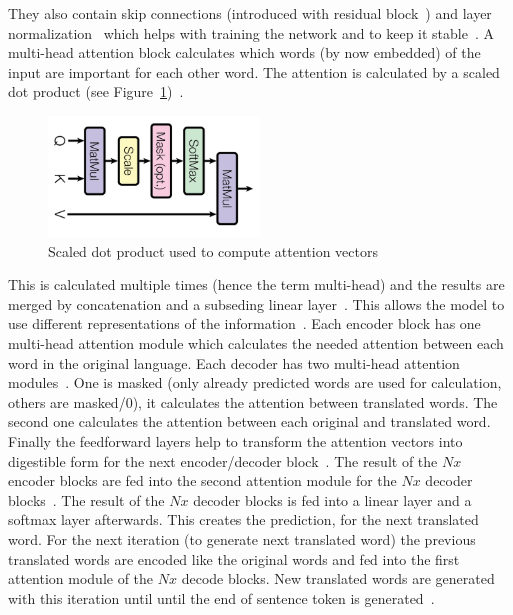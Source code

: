 They also contain skip connections (introduced with residual block~\citep{he_deep_2015}) and layer
normalization~\citep{vaswani_attention_2017} which helps with training the network and to keep it
stable~\citep{liu_rethinking_2021}.
A multi-head attention block calculates which words (by now embedded) of the input are
important for each other word.
The attention is calculated by a scaled dot product (see
Figure~\ref{fig:transformer-dot-product})~\citep{vaswani_attention_2017}.
\begin{figure}[ht]
    \centering
    \includegraphics[width=0.5\textwidth]{img/Transformer-Scaled-Dot-Product-Vasani-Attention-2017.png}
    \caption{Scaled dot product used to compute attention
        vectors~\citep{vaswani_attention_2017}\label{fig:transformer-dot-product}}
\end{figure}
This is calculated multiple times (hence the term multi-head) and the results are merged by
concatenation and a subseding linear layer~\citep{vaswani_attention_2017}.
This allows the model to use different representations of the information~\citep{vaswani_attention_2017}.
Each encoder block has one multi-head attention module which calculates the needed attention
between each word in the original language.
Each decoder has two multi-head attention modules~\citep{vaswani_attention_2017}.
One is masked (only already predicted words are used for calculation, others are masked/0), it
calculates the attention between translated words.
The second one calculates the attention between each original and translated word.
Finally the feedforward layers help to transform the attention vectors into digestible form for the
next encoder/decoder block~\citep{vaswani_attention_2017}.
The result of the $Nx$ encoder blocks are fed into the second attention module for the $Nx$ decoder
blocks~\citep{vaswani_attention_2017}.
The result of the $Nx$ decoder blocks is fed into a linear layer and a softmax layer afterwards.
This creates the prediction, for the next translated word.
For the next iteration (to generate next translated word) the previous translated words are encoded
like the original words and fed into the first attention module of the $Nx$ decode blocks.
New translated words are generated with this iteration until until the end of sentence token
is generated~\citep{vaswani_attention_2017}.

